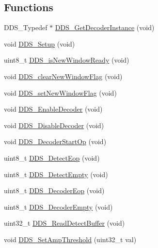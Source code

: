 \subsection*{Functions}
\begin{DoxyCompactItemize}
\item 
D\+D\+S\+\_\+\+Typedef $\ast$ \hyperlink{group___d_d_s___a_p_i_ga03744649eaa04f0f029df082e6ca9575}{D\+D\+S\+\_\+\+Get\+Decoder\+Instance} (void)
\item 
void \hyperlink{group___d_d_s___a_p_i_ga396bdfd69860d5c88d26f7094a3cc41c}{D\+D\+S\+\_\+\+Setup} (void)
\item 
uint8\+\_\+t \hyperlink{group___d_d_s___a_p_i_ga449b3850974b9054a63359b104b440dc}{D\+D\+S\+\_\+is\+New\+Window\+Ready} (void)
\item 
void \hyperlink{group___d_d_s___a_p_i_ga27670bb6491dd40f4c605dbec0bf505d}{D\+D\+S\+\_\+clear\+New\+Window\+Flag} (void)
\item 
void \hyperlink{group___d_d_s___a_p_i_ga010269c11a1f1c9f53f31d1521a22471}{D\+D\+S\+\_\+set\+New\+Window\+Flag} (void)
\item 
void \hyperlink{group___d_d_s___a_p_i_gacd945ae15e0559f2d8dce2860354ed57}{D\+D\+S\+\_\+\+Enable\+Decoder} (void)
\item 
void \hyperlink{group___d_d_s___a_p_i_ga17065a48b0ce7ad24740a144bb24fb55}{D\+D\+S\+\_\+\+Disable\+Decoder} (void)
\item 
void \hyperlink{group___d_d_s___a_p_i_gae4f18ac70ccacf5b0c08f35df3a68c7e}{D\+D\+S\+\_\+\+Decoder\+Start\+Op} (void)
\item 
uint8\+\_\+t \hyperlink{group___d_d_s___a_p_i_gab9346847068834883c8aa90e94ccf847}{D\+D\+S\+\_\+\+Detect\+Eop} (void)
\item 
uint8\+\_\+t \hyperlink{group___d_d_s___a_p_i_ga8432fe55e46d995b5b36dc8c262c0d2d}{D\+D\+S\+\_\+\+Detect\+Empty} (void)
\item 
uint8\+\_\+t \hyperlink{group___d_d_s___a_p_i_gadf4e994e9b2e845a52a72fcc5af9f19b}{D\+D\+S\+\_\+\+Decoder\+Eop} (void)
\item 
uint8\+\_\+t \hyperlink{group___d_d_s___a_p_i_gadafd1ef25b1e3bff8f5975e3001244c0}{D\+D\+S\+\_\+\+Decoder\+Empty} (void)
\item 
uint32\+\_\+t \hyperlink{group___d_d_s___a_p_i_gabfb67b0cb69b7d443df5a21426422bbf}{D\+D\+S\+\_\+\+Read\+Detect\+Buffer} (void)
\item 
void \hyperlink{group___d_d_s___a_p_i_gaaeb0c0549ccf4a0d5c4eb4b8733aad15}{D\+D\+S\+\_\+\+Set\+Amp\+Threshold} (uint32\+\_\+t val)
\item 

\end{DoxyCompactItemize}
